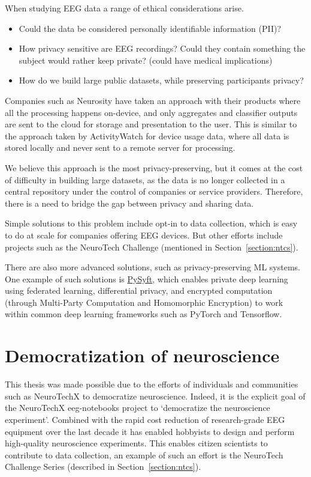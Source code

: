     When studying EEG data a range of ethical considerations arise. 

    \begin{itemize}
        \item Could the data be considered personally identifiable information (PII)? 
        \item How privacy sensitive are EEG recordings? Could they contain something the subject would rather keep private? (could have medical implications)
        \item How do we build large public datasets, while preserving participants privacy?
    \end{itemize}

    Companies such as Neurosity have taken an approach with their products where all the processing happens on-device, and only aggregates and classifier outputs are sent to the cloud for storage and presentation to the user. This is similar to the approach taken by ActivityWatch for device usage data, where all data is stored locally and never sent to a remote server for processing. 

    We believe this approach is the most privacy-preserving, but it comes at the cost of difficulty in building large datasets, as the data is no longer collected in a central repository under the control of companies or service providers. Therefore, there is a need to bridge the gap between privacy and sharing data.

    Simple solutions to this problem include opt-in to data collection, which is easy to do at scale for companies offering EEG devices. But other efforts include projects such as the NeuroTech Challenge (mentioned in Section~\ref{section:ntcs}).

    There are also more advanced solutions, such as privacy-preserving ML systems. One example of such solutions is \href{https://github.com/OpenMined/PySyft}{PySyft}, which enables private deep learning using federated learning, differential privacy, and encrypted computation (through Multi-Party Computation and Homomorphic Encryption) to work within common deep learning frameworks such as PyTorch and Tensorflow.

\section{Democratization of neuroscience}

    This thesis was made possible due to the efforts of individuals and communities such as NeuroTechX to democratize neuroscience. Indeed, it is the explicit goal of the NeuroTechX eeg-notebooks project to `democratize the neuroscience experiment'. Combined with the rapid cost reduction of research-grade EEG equipment over the last decade it has enabled hobbyists to design and perform high-quality neuroscience experiments. This enables citizen scientists to contribute to data collection, an example of such an effort is the NeuroTech Challenge Series (described in Section~\ref{section:ntcs}).

